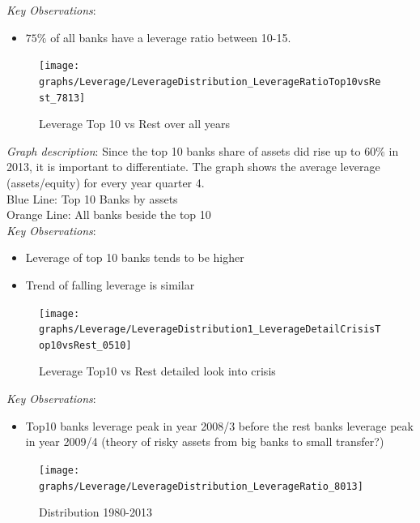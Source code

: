 \documentclass[12pt, a4paper]{article} %
\begin{document}
\noindent \textit{Key Observations}:
\begin{itemize}
\item $75\%$ of all banks have a leverage ratio between 10-15.
\end{itemize}




\begin{figure}[hbtp]
\centering
\caption{Leverage Top 10 vs Rest over all years}
\texttt{[image: graphs/Leverage/LeverageDistribution\_LeverageRatioTop10vsRest\_7813]}
\end{figure}



\newpage

\noindent \textit{Graph description}: Since the top 10 banks share of assets did rise up to 60\% in 2013, it is important to differentiate. The graph shows the average leverage (assets/equity) for every year quarter 4.\\ Blue Line: Top 10 Banks by assets\\
Orange Line: All banks beside the top 10\\

\noindent \textit{Key Observations}:
\begin{itemize}
\item Leverage of top 10 banks tends to be higher
\item Trend of falling leverage is similar
\end{itemize}




\begin{figure}[hbtp]
\centering
\caption{Leverage Top10 vs Rest detailed look into crisis}
\texttt{[image: graphs/Leverage/LeverageDistribution1\_LeverageDetailCrisisTop10vsRest\_0510]}
\end{figure}


\noindent \textit{Key Observations}:
\begin{itemize}
\item Top10 banks leverage peak in year 2008/3 before the rest banks leverage peak in year 2009/4 (theory of risky assets from big banks to small transfer?) 
\end{itemize}









\begin{figure}[hbtp]
\centering
\caption{Distribution 1980-2013}
\texttt{[image: graphs/Leverage/LeverageDistribution\_LeverageRatio\_8013]}
\end{figure}
\end{document}
